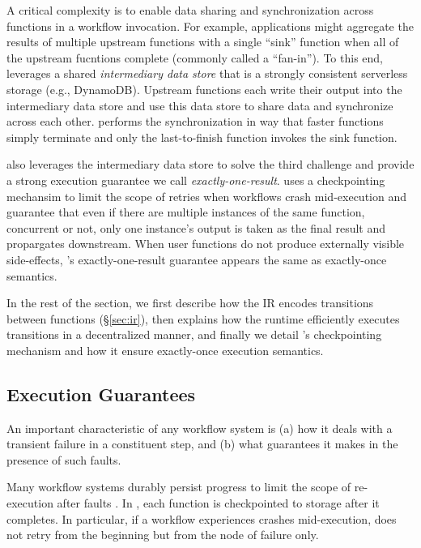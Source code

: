 A critical complexity is to enable data sharing and synchronization across
functions in a workflow invocation. For example, applications might aggregate
the results of multiple upstream functions with a single ``sink'' function
when all of the upstream fucntions complete (commonly called a ``fan-in''). To
this end, \name{} leverages a shared \emph{intermediary data store} that is a
strongly consistent serverless storage (e.g., DynamoDB). Upstream functions
each write their output into the intermediary data
store and use this data store to share data and  synchronize across each other. \name{} performs the synchronization in way that faster functions simply terminate and only the last-to-finish
function invokes the sink function. 

\name{} also leverages the intermediary data store to solve the third
challenge and provide a strong execution guarantee we call
\emph{exactly-one-result}. \name{} uses a checkpointing mechansim to limit the
scope of retries when workflows crash mid-execution and guarantee that even if
there are multiple instances of the same function, concurrent or not, only one
instance's output is taken as the final result and propargates downstream.
When user functions do not produce externally visible side-effects, \name{}'s
exactly-one-result guarantee appears the same as exactly-once semantics.

In the rest of the section, we first describe how the \name{} IR encodes
transitions between functions (\S\ref{sec:ir}), then explains how the \name{}
runtime efficiently executes transitions in a decentralized manner, and
finally we detail \name{}'s checkpointing mechanism and how it ensure
exactly-once execution semantics. 









\subsection{Execution Guarantees}\label{sec:exec-gntee}

An important characteristic of any workflow system is (a) how it deals with  a
transient failure in a constituent step, and (b) what guarantees it makes in
the presence of such faults.
 
Many workflow systems durably persist progress to limit the scope of re-execution after faults
\cite{aws-step-functions, durable-functions, netherite, google-workflows, kappa}.
In \name{}, each function is checkpointed to storage after it
completes. In particular, if a workflow experiences crashes mid-execution,
\name{} does not retry from the beginning but from the node of failure only.


